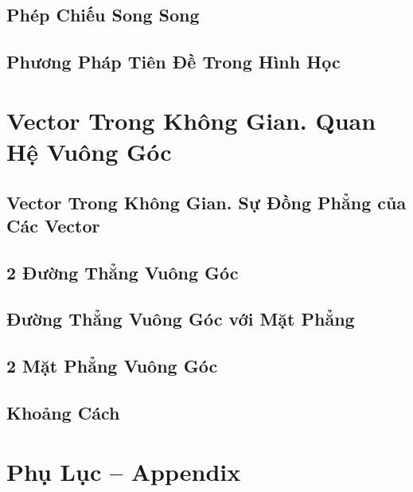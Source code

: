 \documentclass[oneside]{book}
\numberwithin{equation}{section}
\begin{document}
\section{Phép Chiếu Song Song}

\section{Phương Pháp Tiên Đề Trong Hình Học}


\chapter{Vector Trong Không Gian. Quan Hệ Vuông Góc}

\section{Vector Trong Không Gian. Sự Đồng Phẳng của Các Vector}

\section{2 Đường Thẳng Vuông Góc}

\section{Đường Thẳng Vuông Góc với Mặt Phẳng}

\section{2 Mặt Phẳng Vuông Góc}

\section{Khoảng Cách}


\appendix

\chapter{Phụ Lục -- Appendix}
\end{document}
